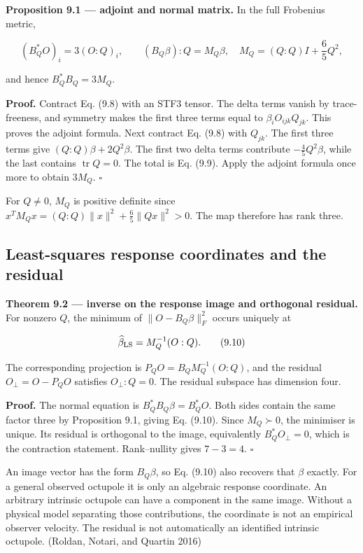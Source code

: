 \documentclass[
  11pt,
  a4paper]{article}
\begin{document}
\textbf{Proposition 9.1 --- adjoint and normal matrix.} In the full Frobenius metric,

\[
(B_Q^*O)_i=3(O:Q)_i,\qquad
(B_Q\beta):Q=M_Q\beta,
\quad M_Q=(Q:Q)I+\frac65Q^2,
\tag{9.9}
\]

and hence \(B_Q^*B_Q=3M_Q\).

\textbf{Proof.} Contract Eq. (9.8) with an STF3 tensor. The delta terms vanish by trace-freeness, and symmetry makes the first three terms equal to \(\beta_iO_{ijk}Q_{jk}\). This proves the adjoint formula. Next contract Eq. (9.8) with \(Q_{jk}\). The first three terms give \((Q:Q)\beta+2Q^2\beta\). The first two delta terms contribute \(-\tfrac45Q^2\beta\), while the last contains \(\operatorname{tr}Q=0\). The total is Eq. (9.9). Apply the adjoint formula once more to obtain \(3M_Q\). \(\square\)

For \(Q\ne0\), \(M_Q\) is positive definite since
\(x^TM_Qx=(Q:Q)\|x\|^2+\tfrac65\|Qx\|^2>0\).
The map therefore has rank three.

\hypertarget{least-squares-response-coordinates-and-the-residual}{%
\subsection{Least-squares response coordinates and the residual}\label{least-squares-response-coordinates-and-the-residual}}

\textbf{Theorem 9.2 --- inverse on the response image and orthogonal residual.} For nonzero \(Q\), the minimum of \(\|O-B_Q\beta\|_F^2\) occurs uniquely at

\[
\widehat\beta_{\rm LS}=M_Q^{-1}(O:Q).
\tag{9.10}
\]

The corresponding projection is
\(P_QO=B_QM_Q^{-1}(O:Q)\), and the residual \(O_\perp=O-P_QO\) satisfies \(O_\perp:Q=0\). The residual subspace has dimension four.

\textbf{Proof.} The normal equation is \(B_Q^*B_Q\beta=B_Q^*O\). Both sides contain the same factor three by Proposition 9.1, giving Eq. (9.10). Since \(M_Q\succ0\), the minimiser is unique. Its residual is orthogonal to the image, equivalently \(B_Q^*O_\perp=0\), which is the contraction statement. Rank--nullity gives \(7-3=4\). \(\square\)

An image vector has the form \(B_Q\beta\), so Eq. (9.10) also recovers that \(\beta\) exactly. For a general observed octupole it is only an algebraic response coordinate. An arbitrary intrinsic octupole can have a component in the same image. Without a physical model separating those contributions, the coordinate is not an empirical observer velocity. The residual is not automatically an identified intrinsic octupole. (Roldan, Notari, and Quartin 2016)
\end{document}
